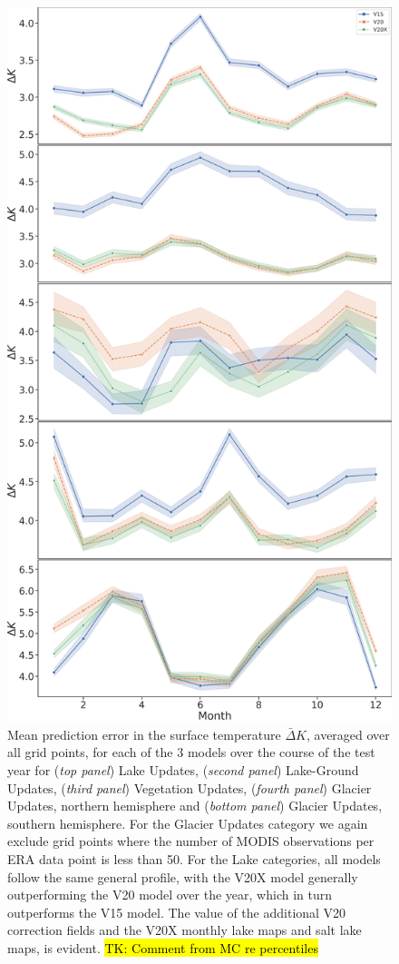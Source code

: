 \documentclass[hess, twostagejnl]{copernicus}
\begin{document}
	\begin{figure}
	\includegraphics[scale=0.2]{mega_stack_ns.png}
	\caption{Mean prediction error in the surface temperature $\bar{\Delta} K$, averaged over all grid points, for each of the 3 models over the course of the test year for (\textit{top panel}) Lake Updates, (\textit{second panel}) Lake-Ground Updates, (\textit{third panel}) Vegetation Updates, (\textit{fourth panel}) Glacier Updates, northern hemisphere and (\textit{bottom panel}) Glacier Updates, southern hemisphere. For the Glacier Updates category we again exclude grid points where the number of MODIS observations per ERA data point is less than 50.  For the Lake categories, all models follow the same general profile, with the V20X model generally outperforming the V20 model over the year, which in turn outperforms the V15 model. The value of the additional V20 correction fields and the V20X monthly lake maps and salt lake maps, is evident. \hl{TK: Comment from MC re percentiles}}
	\label{fig:timeseries}
\end{figure}
\end{document}
